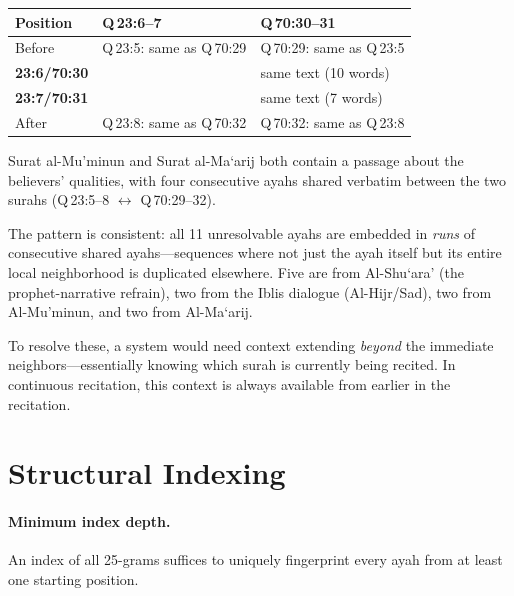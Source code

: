 \documentclass[11pt,a4paper]{article}
\newcommand{\textarabic}[1]{\texorpdfstring{\RL{#1}}{[Arabic]}}
\begin{document}
\begin{algorithm}[H]
\caption{Q\,23:6--7 and Q\,70:30--31 --- Two consecutive shared ayahs}
\label{alg:stuck3}
\smallskip
\centering
\begin{tabular}{@{}l l l@{}}
\toprule
\textbf{Position} & \textbf{Q\,23:6--7} & \textbf{Q\,70:30--31} \\
\midrule
Before & Q\,23:5: same as Q\,70:29 & Q\,70:29: same as Q\,23:5 \\
\textbf{23:6/70:30} & \textarabic{إِلَّا عَلَىٰٓ أَزْوَٰجِهِمْ\ldots} & same text (10 words) \\
\textbf{23:7/70:31} & \textarabic{فَمَنِ ٱبْتَغَىٰ وَرَآءَ ذَٰلِكَ\ldots} & same text (7 words) \\
After & Q\,23:8: same as Q\,70:32 & Q\,70:32: same as Q\,23:8 \\
\bottomrule
\end{tabular}
\smallskip

\raggedright
Surat al-Mu'minun and Surat al-Ma`arij both contain a passage about the believers' qualities, with four consecutive ayahs shared verbatim between the two surahs (Q\,23:5--8 $\leftrightarrow$ Q\,70:29--32).
\end{algorithm}

\medskip

The pattern is consistent: all 11 unresolvable ayahs are embedded in \emph{runs} of consecutive shared ayahs---sequences where not just the ayah itself but its entire local neighborhood is duplicated elsewhere.
Five are from Al-Shu`ara' (the prophet-narrative refrain), two from the Iblis dialogue (Al-Hijr/Sad), two from Al-Mu'minun, and two from Al-Ma`arij.

To resolve these, a system would need context extending \emph{beyond} the immediate neighbors---essentially knowing which surah is currently being recited.
In continuous recitation, this context is always available from earlier in the recitation.

\section{Structural Indexing}
\label{sec:indexing}

\paragraph{Minimum index depth.}
An index of all 25-grams suffices to uniquely fingerprint every ayah from at least one starting position.
\end{document}
